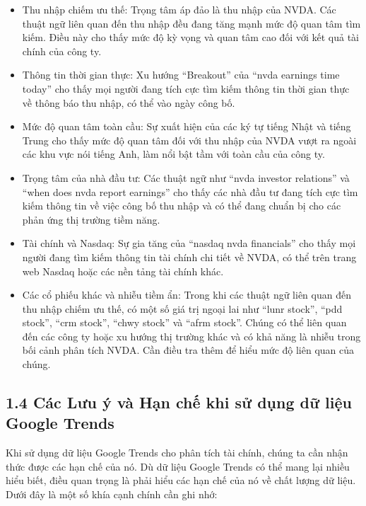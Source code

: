 \begin{itemize}
  \item Thu nhập chiếm ưu thế: Trọng tâm áp đảo là thu nhập của NVDA. Các thuật ngữ liên quan đến thu nhập đều đang tăng mạnh mức độ quan tâm tìm kiếm. Điều này cho thấy mức độ kỳ vọng và quan tâm cao đối với kết quả tài chính của công ty.

  \item Thông tin thời gian thực: Xu hướng ``Breakout'' của ``nvda earnings time today'' cho thấy mọi người đang tích cực tìm kiếm thông tin thời gian thực về thông báo thu nhập, có thể vào ngày công bố.

  \item Mức độ quan tâm toàn cầu: Sự xuất hiện của các ký tự tiếng Nhật và tiếng Trung cho thấy mức độ quan tâm đối với thu nhập của NVDA vượt ra ngoài các khu vực nói tiếng Anh, làm nổi bật tầm với toàn cầu của công ty.

  \item Trọng tâm của nhà đầu tư: Các thuật ngữ như ``nvda investor relations'' và ``when does nvda report earnings'' cho thấy các nhà đầu tư đang tích cực tìm kiếm thông tin về việc công bố thu nhập và có thể đang chuẩn bị cho các phản ứng thị trường tiềm năng.

  \item Tài chính và Nasdaq: Sự gia tăng của ``nasdaq nvda financials'' cho thấy mọi người đang tìm kiếm thông tin tài chính chi tiết về NVDA, có thể trên trang web Nasdaq hoặc các nền tảng tài chính khác.

  \item Các cổ phiếu khác và nhiễu tiềm ẩn: Trong khi các thuật ngữ liên quan đến thu nhập chiếm ưu thế, có một số giá trị ngoại lai như ``lunr stock'', ``pdd stock'', ``crm stock'', ``chwy stock'' và ``afrm stock''. Chúng có thể liên quan đến các công ty hoặc xu hướng thị trường khác và có khả năng là nhiễu trong bối cảnh phân tích NVDA. Cần điều tra thêm để hiểu mức độ liên quan của chúng.
\end{itemize}

\subsection*{1.4 Các Lưu ý và Hạn chế khi sử dụng dữ liệu Google Trends}

Khi sử dụng dữ liệu Google Trends cho phân tích tài chính, chúng ta cần nhận thức được các hạn chế của nó. Dù dữ liệu Google Trends có thể mang lại nhiều hiểu biết, điều quan trọng là phải hiểu các hạn chế của nó về chất lượng dữ liệu. Dưới đây là một số khía cạnh chính cần ghi nhớ:

